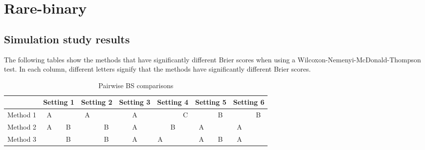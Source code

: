 \chapter{Rare-binary}
\section{Simulation study results} \label{a:pdiffs}
The following tables show the methods that have significantly different Brier scores when using a Wilcoxon-Nemenyi-McDonald-Thompson test.
In each column, different letters signify that the methods have significantly different Brier scores.

\begin{table}[htbp]
  \centering
  \caption{Pairwise BS comparisons}
  \label{tbl:pwbssim}
  \begin{tabular}{|l|cc|cc|c|ccc|cc|cc|}
  \cline{2-13}
  \multicolumn{1}{c}{} & \multicolumn{2}{|c}{Setting 1} & \multicolumn{2}{|c}{Setting 2} & \multicolumn{1}{|c}{Setting 3} & \multicolumn{3}{|c}{Setting 4} & \multicolumn{2}{|c}{Setting 5} & \multicolumn{2}{|c|}{Setting 6}\\
  \hline
  Method 1 & A &   & A &   & A &   &   & C &   & B &   & B \\
  \hline
  Method 2 & A & B &   & B & A &   & B &   & A &   & A &   \\
  \hline
  Method 3 &   & B &   & B & A & A &   &   & A & B & A &   \\
  \hline
  \end{tabular}
\end{table}